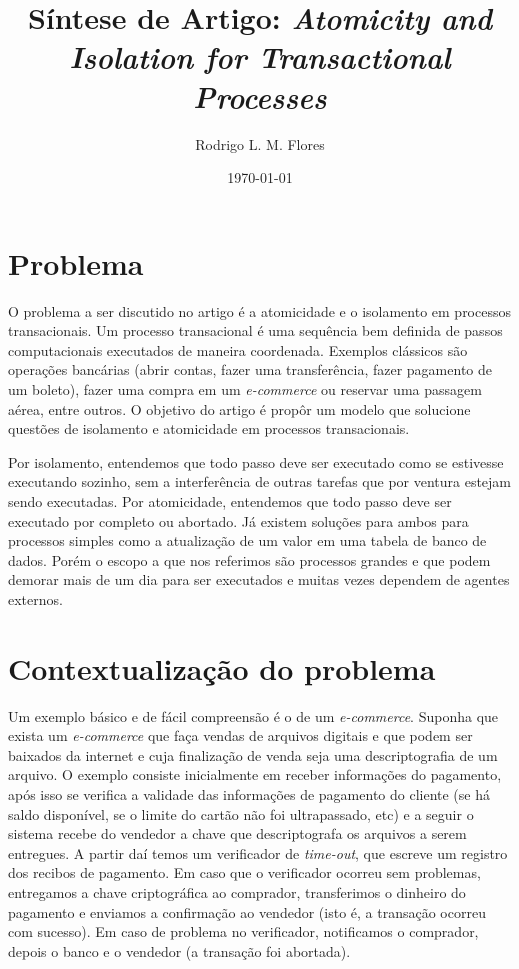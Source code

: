 \documentclass[a4paper,12pt,notitlepage]{article}
\title{Síntese de Artigo: \textit{Atomicity and Isolation for Transactional Processes}}
\author{Rodrigo L. M. Flores}
\date{\today}
\begin{document}
\maketitle

\nocite{alonso}

\section{Problema}

O problema a ser discutido no artigo é a atomicidade e o isolamento em processos transacionais. Um processo transacional é uma sequência bem definida de passos computacionais executados de maneira coordenada. Exemplos clássicos são operações bancárias (abrir contas, fazer uma transferência, fazer pagamento de um boleto), fazer uma compra em um \textit{e-commerce} ou reservar uma passagem aérea, entre outros. O objetivo do artigo é propôr um modelo que solucione questões de isolamento e atomicidade em processos transacionais. 

Por isolamento, entendemos que todo passo deve ser executado como se estivesse executando sozinho, sem a interferência de outras tarefas que por ventura estejam sendo executadas. Por atomicidade, entendemos que todo passo deve ser executado por completo ou abortado. Já existem soluções para ambos para processos simples como a atualização de um valor em uma tabela de banco de dados. Porém o escopo a que nos referimos são processos grandes e que podem demorar mais de um dia para ser executados e muitas vezes dependem de agentes externos.

\section{Contextualização do problema }

Um exemplo básico e de fácil compreensão é o de um \textit{e-commerce}. Suponha que exista um \textit{e-commerce} que faça vendas de arquivos digitais e que podem ser baixados da internet e cuja finalização de venda seja uma descriptografia de um arquivo. O exemplo consiste inicialmente em receber informações do pagamento, após isso
se verifica a validade das informações de pagamento do cliente (se há saldo disponível, se o limite do cartão não foi ultrapassado, etc) e a seguir o sistema recebe do vendedor a chave que descriptografa os arquivos a serem entregues. 
A partir daí temos um verificador de \textit{time-out}, que escreve um registro dos recibos de pagamento. Em caso que o verificador ocorreu sem problemas, entregamos a chave criptográfica ao comprador, transferimos o dinheiro do pagamento e enviamos a confirmação ao vendedor (isto é, a transação ocorreu com sucesso). Em caso de problema no verificador, notificamos o comprador, depois o banco e o vendedor (a transação foi abortada).
\end{document}
